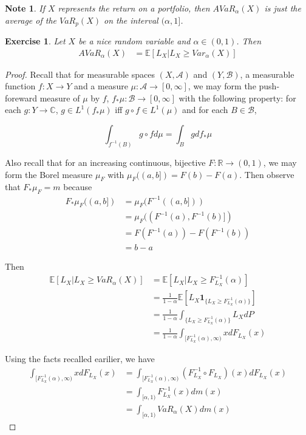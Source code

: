 \documentclass[12pt]{amsart}
\newtheorem{note}[thm]{Note}
\newtheorem{ex}[thm]{Exercise}
\newcommand{\al}{\alpha}
\newcommand{\C}{\mathbb{C}}
\newcommand{\E}{\mathbb{E}}
\newcommand{\R}{\mathbb{R}}
\newcommand{\MA}{\mathcal{A}}
\newcommand{\MB}{\mathcal{B}}
\newcommand{\RG}{[0,\infty]}
\begin{document}
\begin{note}
If $X$ represents the return on a portfolio, then $AVaR_{\al}(X)$ is just the average of the $VaR_{p}(X)$ on the interval $(\al, 1]$.
\end{note}

\begin{ex}
Let $X$ be a nice random variable and $\al\in (0,1)$. Then 
\begin{align*}
AVaR_{\al}(X) 
&= \E[L_X|L_X \geq Var_{\al}(X)]
\end{align*}
\end{ex}

\begin{proof}
Recall that for measurable spaces $(X,\MA)$ and $(Y, \MB)$, a measurable function $f:X \rightarrow Y$ and a measure $\mu:\MA \rightarrow \RG$, we may form the push-foreward measure of $\mu$ by $f$, $f_{*}\mu:\MB \rightarrow \RG$ with the following property: for each $g:Y \rightarrow \C$, $g \in L^1(f_* \mu)$ iff  $g \circ f \in L^1(\mu)$ and for each $B \in \MB$, 

$$\int_{f^{-1}(B)}g \circ f d\mu = \int_B g d f_*\mu$$

Also recall that for an increasing continuous, bijective $F:\R \rightarrow (0,1)$, we may form the Borel measure $\mu_F$ with $\mu_F((a,b]) = F(b)-F(a)$. Then observe that $F_*\mu_F = m$ because
\begin{align*}
{F}_{*} \mu_F ((a,b]) 
&= \mu_F(F^{-1}((a,b]))\\
&= \mu_F((F^{-1}(a), F^{-1}(b)]) \\ 
&= F(F^{-1}(a)) - F(F^{-1}(b))\\
&= b-a
\end{align*}

Then  
\begin{align*}
\E[L_X |L_X \geq VaR_{\al}(X)]
&= \E[L_X|L_X \geq F^{-1}_{L_X}(\al)] \\ 
&= \frac{1}{1-\al}\E [L_X \mathbf{1}_{\{L_X \geq F^{-1}_{L_X}(\al)\}}] \\ 
&=  \frac{1}{1-\al} \int_{\{L_X \geq F_{L_X}^{-1}(\al)\}}L_X dP \\
& = \frac{1}{1-\al} \int_{[F_{L_X}^{-1}(\al),  \infty)}xd F_{L_X}(x)
\end{align*}

Using the facts recalled earilier, we have  
\begin{align*}
\int_{[F_{L_X}^{-1}(\al),  \infty)}xd F_{L_X}(x) 
&= \int_{[F_{L_X}^{-1}(\al),  \infty)}(F^{-1}_{L_X} \circ F_{L_X}) (x)d F_{L_X}(x) \\
&= \int_{[\al,  1)} F^{-1}_{L_X}(x)dm(x)\\
&= \int_{[\al,  1)} VaR_{\al}(X)dm(x)
\end{align*}
\end{proof}
\end{document}
